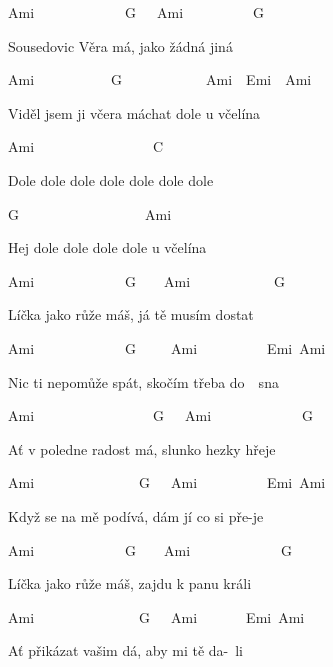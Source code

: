 
Ami~~~~~~~~~~~~~G~~~Ami~~~~~~~~~~G

Sousedovic Věra má, jako žádná jiná

Ami~~~~~~~~~~~G~~~~~~~~~~~~Ami~~Emi~~Ami

Viděl jsem ji včera máchat dole u včelína

\bigskip

\begin{chorustext}
Ami~~~~~~~~~~~~~~~~~C~~~~~~~~~~~~~

Dole dole dole dole dole dole dole

G~~~~~~~~~~~~~~~~~~Ami~~~~~~~~~~~

Hej dole dole dole dole u včelína
\end{chorustext}

\bigskip

\chorus

\bigskip

Ami~~~~~~~~~~~~~G~~~~Ami~~~~~~~~~~~~G

Líčka jako růže máš, já tě musím dostat

Ami~~~~~~~~~~~~~G~~~~~Ami~~~~~~~~~~Emi~Ami

Nic ti nepomůže spát, skočím třeba do~~sna

\bigskip

\chorus

\bigskip

Ami~~~~~~~~~~~~~~~~~G~~~Ami~~~~~~~~~~~~~G

Ať v poledne radost má, slunko hezky hřeje

Ami~~~~~~~~~~~~~~~G~~~Ami~~~~~~~~~~Emi~Ami

Když se na mě podívá, dám jí co si pře-je

\chorus

\bigskip

Ami~~~~~~~~~~~~~G~~~~Ami~~~~~~~~~~~~~G

Líčka jako růže máš, zajdu k panu králi

Ami~~~~~~~~~~~~~~~G~~~Ami~~~~~~~Emi~Ami

Ať přikázat vašim dá, aby mi tě da-~li

\bigskip

\chorus